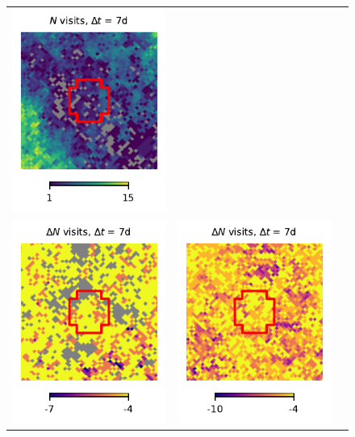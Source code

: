 \documentclass[preprintm,linenumbers]{aastex631}
\begin{document}
\begin{figure}
\begin{tabular}{  c c c}
				\includegraphics{results/skymaps_cutout/skymaps_cutout_first_year_one_snap_v4_0_10yrs_db_noDD_noTwi_tscale-7_nside-256_doAllTemplateMetrics_reduceCount_r_GP_noDD_noTwi.pdf} \\
				\includegraphics{results/skymaps_cutout/skymaps_cutout_delta_first_year_one_snap_v4_0_10yrs_db_noDD_noTwi_tscale-7_nside-256_doAllTemplateMetrics_reduceCount_r_NES_noDD_noTwi.pdf} &
				\includegraphics{results/skymaps_cutout/skymaps_cutout_delta_first_year_one_snap_v4_0_10yrs_db_noDD_noTwi_tscale-7_nside-256_doAllTemplateMetrics_reduceCount_r_WFD_noDD_noTwi.pdf} &

\end{tabular}
\end{figure}
\end{document}
